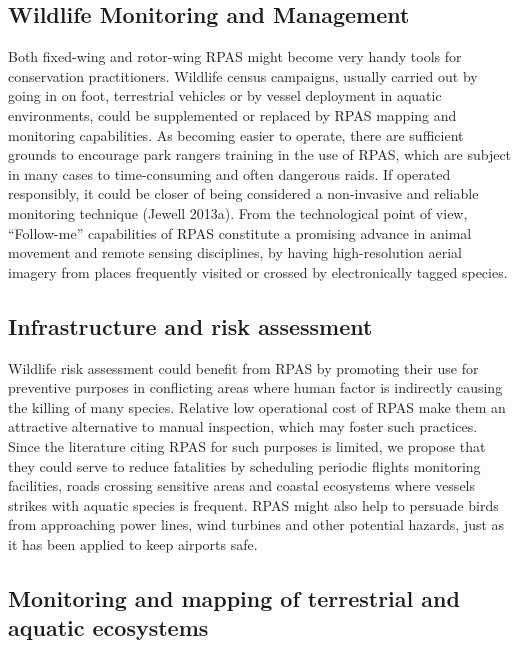 \documentclass[]{interact}
\theoremstyle{plain}%
\theoremstyle{definition}
\theoremstyle{remark}
\begin{document}
\subsection{Wildlife Monitoring and
Management}\label{wildlife-monitoring-and-management-1}

Both fixed-wing and rotor-wing RPAS might become very handy tools for
conservation practitioners. Wildlife census campaigns, usually carried
out by going in on foot, terrestrial vehicles or by vessel deployment in
aquatic environments, could be supplemented or replaced by RPAS mapping
and monitoring capabilities. As becoming easier to operate, there are
sufficient grounds to encourage park rangers training in the use of
RPAS, which are subject in many cases to time-consuming and often
dangerous raids. If operated responsibly, it could be closer of being
considered a non-invasive and reliable monitoring technique (Jewell
2013a). From the technological point of view, ``Follow-me'' capabilities
of RPAS constitute a promising advance in animal movement and remote
sensing disciplines, by having high-resolution aerial imagery from
places frequently visited or crossed by electronically tagged species.

\subsection{Infrastructure and risk
assessment}\label{infrastructure-and-risk-assessment-1}

Wildlife risk assessment could benefit from RPAS by promoting their use
for preventive purposes in conflicting areas where human factor is
indirectly causing the killing of many species. Relative low operational
cost of RPAS make them an attractive alternative to manual inspection,
which may foster such practices. Since the literature citing RPAS for
such purposes is limited, we propose that they could serve to reduce
fatalities by scheduling periodic flights monitoring facilities, roads
crossing sensitive areas and coastal ecosystems where vessels strikes
with aquatic species is frequent. RPAS might also help to persuade birds
from approaching power lines, wind turbines and other potential hazards,
just as it has been applied to keep airports safe.

\subsection{Monitoring and mapping of terrestrial and aquatic
ecosystems}\label{monitoring-and-mapping-of-terrestrial-and-aquatic-ecosystems-1}
\end{document}
